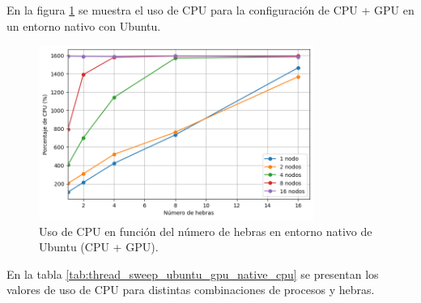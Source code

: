 En la figura \ref{fig:thread_sweep_ubuntu_gpu_native_cpu} se muestra el uso de CPU para la configuración de CPU + GPU en un entorno nativo con Ubuntu.

\begin{figure}[ht]
    \centering
    \includegraphics[width=0.8\textwidth]{imagenes/cap5/thread_sweep_ubuntu_gpu_native_cpu.png}
    \caption{Uso de CPU en función del número de hebras en entorno nativo de Ubuntu (CPU + GPU).}
    \label{fig:thread_sweep_ubuntu_gpu_native_cpu}
\end{figure}

En la tabla \ref{tab:thread_sweep_ubuntu_gpu_native_cpu} se presentan los valores de uso de CPU para distintas combinaciones de procesos y hebras.

